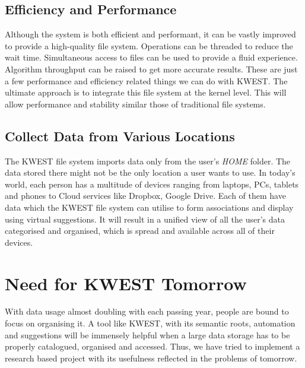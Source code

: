 \subsection*{Efficiency and Performance}
Although the system is both efficient and performant, it can be vastly improved to provide a high-quality file system. Operations can be threaded to reduce the wait time. Simultaneous access to files can be used to provide a fluid experience. Algorithm throughput can be raised to get more accurate results. These are just a few performance and efficiency related things we can do with KWEST. The ultimate approach is to integrate this file system at the kernel level. This will allow performance and stability similar those of traditional file systems.

\subsection*{Collect Data from Various Locations}
The KWEST file system imports data only from the user's \textit{HOME} folder. The data stored there might not be the only location a user wants to use. In today's world, each person has a multitude of devices ranging from laptops, PCs, tablets and phones to Cloud services like Dropbox, Google Drive. Each of them have data which the KWEST file system can utilise to form associations and display using virtual suggestions. It will result in a unified view of all the user's data categorised and organised, which is spread and available across all of their devices.

\section{Need for KWEST Tomorrow}
With data usage almost doubling with each passing year, people are bound to focus on organising it. A tool like KWEST,  with its semantic roots, automation and suggestions will be immensely helpful when a large data storage has to be properly catalogued, organised and accessed. Thus, we have tried to implement a research based project with its usefulness reflected in the problems of tomorrow.